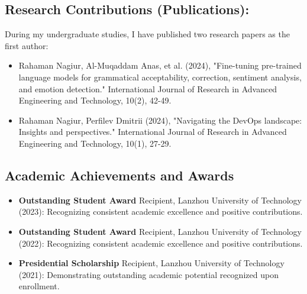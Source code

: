 \documentclass[12pt,a4paper]{article}
\begin{document}
\begin{CJK*}{UTF8}{gbsn}
\subsection*{Research Contributions (Publications):}
During my undergraduate studies, I have published two research papers as the first author:
\begin{itemize}
    \item Rahaman Nagiur, Al-Muqaddam Anas, et al. (2024), "Fine-tuning pre-trained language models for grammatical acceptability, correction, sentiment analysis, and emotion detection." International Journal of Research in Advanced Engineering and Technology, 10(2), 42-49. 
    \item Rahaman Nagiur, Perfilev Dmitrii (2024), "Navigating the DevOps landscape: Insights and perspectives." International Journal of Research in Advanced Engineering and Technology, 10(1), 27-29. 
\end{itemize}


\subsection*{Academic Achievements and Awards}
\begin{itemize}
    \item \textbf{Outstanding Student Award} Recipient, Lanzhou University of Technology (2023): Recognizing consistent academic excellence and positive contributions.
    \item \textbf{Outstanding Student Award} Recipient, Lanzhou University of Technology (2022): Recognizing consistent academic excellence and positive contributions.
    \item \textbf{Presidential Scholarship} Recipient, Lanzhou University of Technology (2021): Demonstrating outstanding academic potential recognized upon enrollment.
\end{itemize}


\end{CJK*}
\end{document}
